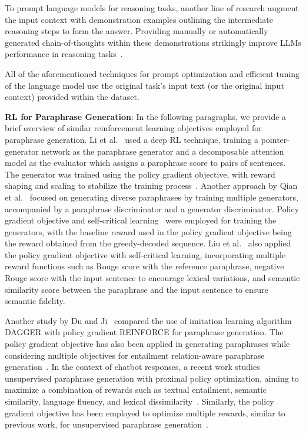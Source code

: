 \documentclass[11pt]{article}
\begin{document}
To prompt language models for reasoning tasks, another line of research augment the input context with demonstration examples outlining the intermediate reasoning steps to form the answer. Providing manually or automatically generated chain-of-thoughts within these demonstrations strikingly improve LLMs performance in reasoning tasks~\cite{DBLP:journals/corr/abs-2201-11903, zhang2022automatic, NEURIPS2022_8bb0d291}.

All of the aforementioned techniques for prompt optimization and efficient tuning of the language model use the original task's input text (or the original input context) provided within the dataset.

\noindent
{\bf RL for Paraphrase Generation}:
In the following paragraphs, we provide a brief overview of similar reinforcement learning objectives employed for paraphrase generation. Li et al.~\cite{li-etal-2018-paraphrase} used a deep RL technique, training a pointer-generator network as the paraphrase generator and a decomposable attention model as the evaluator which assigns a paraphrase score to pairs of sentences. The generator was trained using the policy gradient objective, with reward shaping and scaling to stabilize the training process~\cite{li-etal-2018-paraphrase}. Another approach by Qian et al.~\cite{qian-etal-2019-exploring} focused on generating diverse paraphrases by training multiple generators, accompanied by a paraphrase discriminator and a generator discriminator. Policy gradient objective and self-critical learning~\cite{DBLP:journals/corr/RennieMMRG16} were employed for training the generators, with the baseline reward used in the policy gradient objective being the reward obtained from the greedy-decoded sequence. Liu et al.~\cite{liu-etal-2020-learning} also applied the policy gradient objective with self-critical learning, incorporating multiple reward functions such as Rouge score with the reference paraphrase, negative Rouge score with the input sentence to encourage lexical variations, and semantic similarity score between the paraphrase and the input sentence to ensure semantic fidelity.

Another study by Du and Ji~\cite{du-ji-2019-empirical} compared the use of imitation learning algorithm DAGGER with policy gradient REINFORCE for paraphrase generation. The policy gradient objective has also been applied in generating paraphrases while considering multiple objectives for entailment relation-aware paraphrase generation~\cite{Sancheti_Srinivasan_Rudinger_2022}. In the context of chatbot responses, a recent work studies unsupervised paraphrase generation with proximal policy optimization, aiming to maximize a combination of rewards such as textual entailment, semantic similarity, language fluency, and lexical dissimilarity~\cite{DBLP:journals/corr/abs-2103-12777}. Similarly, the policy gradient objective has been employed to optimize multiple rewards, similar to previous work, for unsupervised paraphrase generation~\cite{10.1145/3394486.3403231}.
\end{document}
